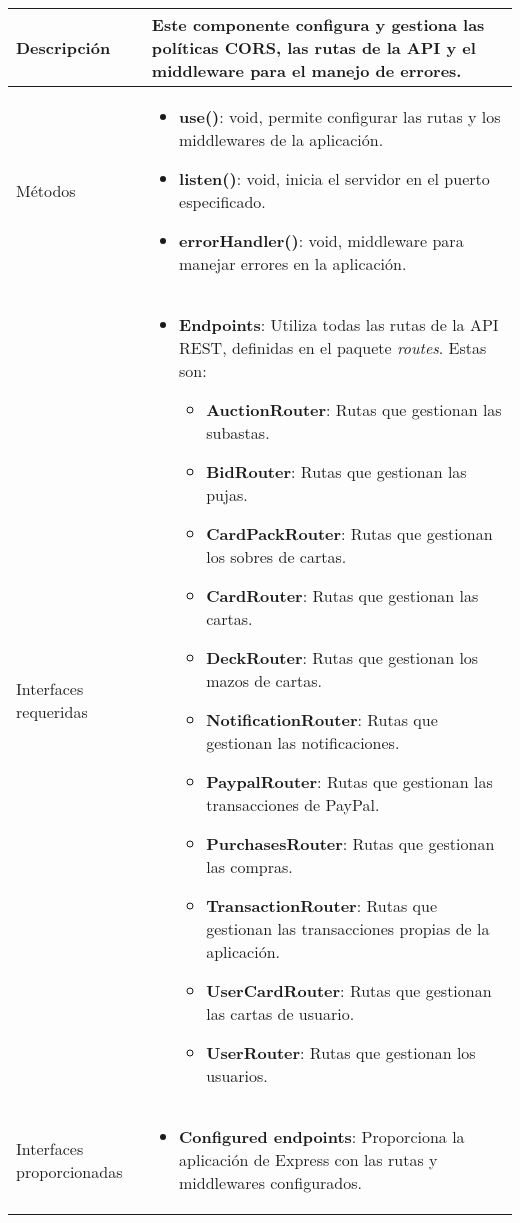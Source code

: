 \begin{longtable}{
    >{\columncolor{lightgreen!20}}p{4cm}
    p{12cm}
    }
    \midrule
    Descripción & Este componente configura y gestiona las políticas CORS, las rutas de la API y el middleware para el manejo de errores. \\
    \midrule
    Métodos & \begin{itemize}[nosep,leftmargin=*]
      \item \textbf{use()}: void, permite configurar las rutas y los middlewares de la aplicación.
      \item \textbf{listen()}: void, inicia el servidor en el puerto especificado.
      \item \textbf{errorHandler()}: void, middleware para manejar errores en la aplicación.
    \end{itemize} \\
    \midrule
    Interfaces requeridas & \begin{itemize}[nosep,leftmargin=*]
      \item \textbf{Endpoints}: Utiliza todas las rutas de la API REST, definidas en el paquete \textit{routes}. Estas son:
        \begin{itemize}[nosep,leftmargin=*]
        \item \textbf{AuctionRouter}: Rutas que gestionan las subastas.
        \item \textbf{BidRouter}: Rutas que gestionan las pujas.
        \item \textbf{CardPackRouter}: Rutas que gestionan los sobres de cartas.
        \item \textbf{CardRouter}: Rutas que gestionan las cartas.
        \item \textbf{DeckRouter}: Rutas que gestionan los mazos de cartas.
        \item \textbf{NotificationRouter}: Rutas que gestionan las notificaciones.
        \item \textbf{PaypalRouter}: Rutas que gestionan las transacciones de PayPal.
        \item \textbf{PurchasesRouter}: Rutas que gestionan las compras.
        \item \textbf{TransactionRouter}: Rutas que gestionan las transacciones propias de la aplicación.
        \item \textbf{UserCardRouter}: Rutas que gestionan las cartas de usuario.
        \item \textbf{UserRouter}: Rutas que gestionan los usuarios.
        \end{itemize}
    \end{itemize} \\
    \midrule
    Interfaces proporcionadas & \begin{itemize}[nosep,leftmargin=*]
      \item \textbf{Configured endpoints}: Proporciona la aplicación de Express con las rutas y middlewares configurados.   
    \end{itemize} \\
\end{longtable}


